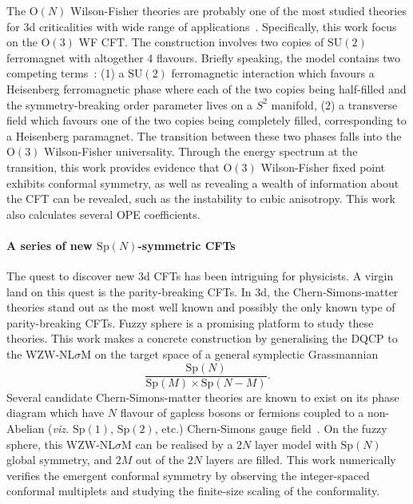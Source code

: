\documentclass{timesjhep}
\begin{document}
The $\mathrm{O}(N)$ Wilson-Fisher theories are probably one of the most studied theories for 3d criticalities with wide range of applications~\cite{Wilson1971WF,Sachdev2011Quantum,Cardy1996Scaling}. Specifically, this work focus on the $\mathrm{O}(3)$ WF CFT. The construction involves two copies of $\mathrm{SU}(2)$ ferromagnet with altogether 4 flavours. Briefly speaking, the model contains two competing terms~: (1) a $\mathrm{SU}(2)$ ferromagnetic interaction which favours a Heisenberg ferromagnetic phase where each of the two copies being half-filled and the symmetry-breaking order parameter lives on a $S^2$ manifold, (2) a transverse field which favours one of the two copies being completely filled, corresponding to a Heisenberg paramagnet. The transition between these two phases falls into the $\mathrm{O}(3)$ Wilson-Fisher universality. Through the energy spectrum at the transition, this work provides evidence that $\mathrm{O}(3)$ Wilson-Fisher fixed point exhibits conformal symmetry, as well as revealing a wealth of information about the CFT can be revealed, such as the instability to cubic anisotropy. This work also calculates several OPE coefficients. 

\paragraph{A series of new $\mathrm{Sp}(N)$-symmetric CFTs~\cite{Zhou2024Oct}}

The quest to discover new 3d CFTs has been intriguing for physicists. A virgin land on this quest is the parity-breaking CFTs. In 3d, the Chern-Simons-matter theories stand out as the most well known and possibly the only known type of parity-breaking CFTs. Fuzzy sphere is a promising platform to study these theories. This work makes a concrete construction by generalising the DQCP to the WZW-NL$\sigma$M on the target space of a general symplectic Grassmannian 
\begin{equation}
    \frac{\mathrm{Sp}(N)}{\mathrm{Sp}(M)\times\mathrm{Sp}(N-M)}.
\end{equation}
Several candidate Chern-Simons-matter theories are known to exist on its phase diagram which have $N$ flavour of gapless bosons or fermions coupled to a non-Abelian (\textit{viz.} $\mathrm{Sp}(1)$, $\mathrm{Sp}(2)$, etc.) Chern-Simons gauge field~\cite{Komargodski2017QCD}. On the fuzzy sphere, this WZW-NL$\sigma$M can be realised by a $2N$ layer model with $\mathrm{Sp}(N)$ global symmetry, and $2M$ out of the $2N$ layers are filled. This work numerically verifies the emergent conformal symmetry by observing the integer-spaced conformal multiplets and studying the finite-size scaling of the conformality. 
\end{document}
